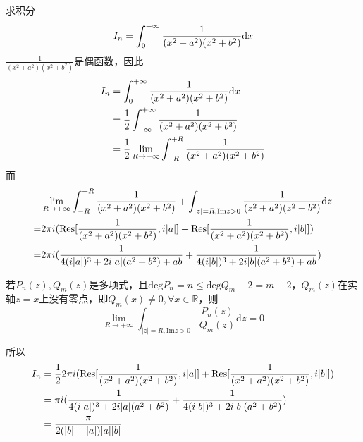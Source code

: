 \begin{homeworkProblem}
    求积分
    \[I_n=\int_0^{+\infty}\frac{1}{(x^2+a^2)(x^2+b^2)}\mathrm{d}x\]
\solution
$\frac{1}{(x^2+a^2)(x^2+b^2)}$是偶函数，因此
\[\begin{split}
I_n&=\int_0^{+\infty}\frac{1}{(x^2+a^2)(x^2+b^2)}\mathrm{d}x\\
&=\frac{1}{2}\int_{-\infty}^{+\infty}\frac{1}{(x^2+a^2)(x^2+b^2)}\\
&=\frac{1}{2}\lim_{R \rightarrow +\infty}\int_{-R}^{+R}\frac{1}{(x^2+a^2)(x^2+b^2)}
\end{split}\]
而
\[\begin{split}
&\lim_{R \rightarrow +\infty}\int_{-R}^{+R}\frac{1}{(x^2+a^2)(x^2+b^2)}
+ \int_{|z|=R, \mathrm{Im}z>0}\frac{1}{(z^2+a^2)(z^2+b^2)}\mathrm{d}z\\
=& 2\pi i(\mathrm{Res}[\frac{1}{(x^2+a^2)(x^2+b^2)}, i|a|] + \mathrm{Res}[\frac{1}{(x^2+a^2)(x^2+b^2)}, i|b|])\\
=& 2\pi i(\frac{1}{4(i|a|)^3+2i|a|(a^2+b^2)+ab}+\frac{1}{4(i|b|)^3+2i|b|(a^2+b^2)+ab})
\end{split}\]
\begin{theorem*}
    若$P_n(z),Q_m(z)$是多项式，且$\mathrm{deg}P_n = n \leq \mathrm{deg}Q_m-2=m-2$，$Q_m(z)$在实轴$z=x$上没有零点，即$Q_m(x)\neq0,\forall x\in\mathbb{R}$，则\[\lim_{R \rightarrow +\infty}\int_{|z|=R, \mathrm{Im}z>0}\frac{P_n(z)}{Q_m(z)}\mathrm{d}z=0\]
\end{theorem*}
所以
\[\begin{split}
I_n &= \frac{1}{2}2\pi i(\mathrm{Res}[\frac{1}{(x^2+a^2)(x^2+b^2)}, i|a|] + \mathrm{Res}[\frac{1}{(x^2+a^2)(x^2+b^2)}, i|b|])\\
&=\pi i(\frac{1}{4(i|a|)^3+2i|a|(a^2+b^2)}+\frac{1}{4(i|b|)^3+2i|b|(a^2+b^2)})\\
&= \frac{\pi}{2(|b|-|a|)|a||b|}
\end{split}\]
\end{homeworkProblem}

